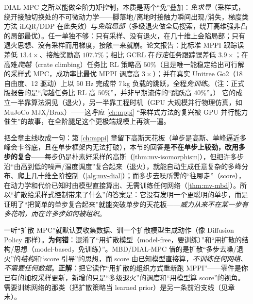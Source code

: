 \noindent DIAL-MPC 之所以能做全阶力矩控制，本质是两个“免”叠加：\emph{免求导}（采样式，绕开接触切换处的不可微动力学——脚落地/离地时接触力瞬间出现/消失，梯度类方法 iLQR/DDP 在此失效）与\emph{免陷局部}（多级退火做全局搜索，绕开高维强非凸的局部最优）。任一单独不够：只有采样、没有退火，在几十维上会陷局部；只有退火思想、没有采样而用梯度，接触一来就崩。论文报告：比标准 MPPI 跟踪误差低 $13.4\times$、接触奖励高 $107.7\%$；相比 GCRL 在\emph{行走}任务跟踪误差低 $3.9\times$；在高难\emph{爬越}（crate climbing）任务比 RL 策略高 $50\%$（且是唯一能稳定给出可行解的采样式 MPC，成功率比最优 MPPI 调度高 $3\times$）；并在真实 Unitree Go2（18 自由度、12 驱动）上以 $50$ Hz 完成带 $7$\,kg 负载的跳跃，全程\emph{免训练}\cite{xue2025dial}。（注：正式版报告的是“爬越任务比 RL 高 $50\%$”，并非早期流传的“跳跃高 $40\%$”。） 它的成立一半靠算法洞见（退火），另一半靠工程时机（GPU 大规模并行物理仿真，如 MuJoCo MJX/Brax）——这呼应 \cref{ch:mppi} “采样式方法的复兴被 GPU 并行能力催生”的故事，在全阶腿足这个更极端规模上再演一遍。

\begin{insight}
把全章主线收成一句：第 \cref{ch:mppi} 章留下高斯天花板（单步是高斯、单峰逼近多峰会卡谷底，且在单步框架内无法打破），本节的回答是\textbf{不在单步上较劲，改用多步的复合}——每步仍是朴素好采样的高斯（\cref{thm:mv-isomorphism}），但把许多步沿“由高到低的噪声/温度调度”复合起来（退火），就能自动生成任意复杂的多峰分布、爬上几十维全阶控制（\cref{alg:mv-dial}）；而多步去噪所需的“往哪走”（score），在动力学和代价已知时由模型直接算出、无需训练任何网络（\cref{thm:mv-mbd}）。所以“扩散给采样式控制带来了什么”的答案是：它没有发明一个更聪明的单步，而是证明了“把简单的单步复合起来”就能突破单步的天花板——\emph{威力从来不在某一步有多花哨，而在许多步如何被组织}。
\end{insight}

\begin{pitfall}
一听“扩散 MPC”就默认要收集数据、训一个扩散模型生成动作（像 Diffusion Policy 那样）。\textbf{为何错}：混淆了“用扩散模型（model-free，要训练）”和“用扩散的结构/思想（model-based，免训练）”。MBD/DIAL-MPC 借的是扩散“多步去噪/退火”的\emph{结构}和“score 引导”的思想，而 score 由已知模型直接算，\emph{不训练任何网络、不需要任何数据}。\textbf{正解}：把它读作“用扩散的组织方式重新跑 MPPI”——零件是你已有的加权采样更新，新增的只是“多级退火”的调度和“用模型算 score”的视角。需要训练网络的那类（把扩散策略当 learned prior）是另一条前沿支线（见章末）。
\end{pitfall}

